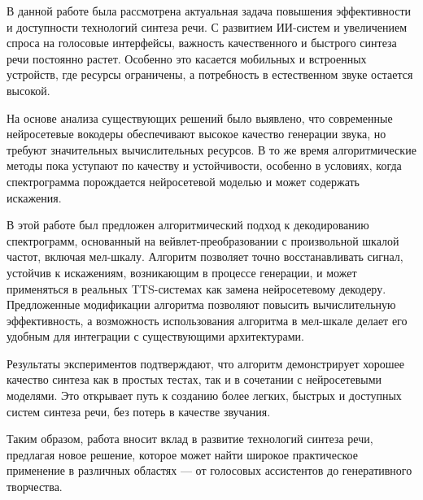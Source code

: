 \Conclusion %

В данной работе была рассмотрена актуальная задача повышения эффективности и доступности технологий синтеза речи. 
С развитием ИИ-систем и увеличением спроса на голосовые интерфейсы, важность качественного и быстрого синтеза речи постоянно растет. 
Особенно это касается мобильных и встроенных устройств, где ресурсы ограничены, а потребность в естественном звуке остается высокой.

На основе анализа существующих решений было выявлено, что современные нейросетевые вокодеры обеспечивают высокое качество генерации звука, 
но требуют значительных вычислительных ресурсов. 
В то же время алгоритмические методы пока уступают по качеству и устойчивости, особенно в условиях, 
когда спектрограмма порождается нейросетевой моделью и может содержать искажения.

В этой работе был предложен алгоритмический подход к декодированию спектрограмм, 
основанный на вейвлет-преобразовании с произвольной шкалой частот, включая мел-шкалу. 
Алгоритм позволяет точно восстанавливать сигнал, устойчив к искажениям, возникающим в процессе генерации, 
и может применяться в реальных TTS-системах как замена нейросетевому декодеру. 
Предложенные модификации алгоритма позволяют повысить вычислительную эффективность, 
а возможность использования алгоритма в мел-шкале делает его удобным для интеграции с существующими архитектурами.

Результаты экспериментов подтверждают, что алгоритм демонстрирует хорошее качество синтеза как в простых тестах, 
так и в сочетании с нейросетевыми моделями. 
Это открывает путь к созданию более легких, быстрых и доступных систем синтеза речи, 
без потерь в качестве звучания.

Таким образом, работа вносит вклад в развитие технологий синтеза речи, предлагая новое решение, 
которое может найти широкое практическое применение в различных областях — от голосовых ассистентов до генеративного творчества.